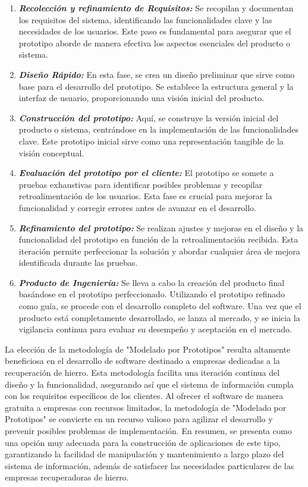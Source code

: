 \documentclass[12pt,onehalfspacing]{report}
\begin{document}
\begin{enumerate}
    \item \textbf{\textit{Recolección y refinamiento de Requisitos:}} Se recopilan y documentan los requisitos del sistema, identificando las funcionalidades clave y las necesidades de los usuarios. Este paso es fundamental para asegurar que el prototipo aborde de manera efectiva los aspectos esenciales del producto o sistema.
    \item \textbf{\textit{Diseño Rápido:}} En esta fase, se crea un diseño preliminar que sirve como base para el desarrollo del prototipo. Se establece la estructura general y la interfaz de usuario, proporcionando una visión inicial del producto.
    \item \textbf{\textit{Construcción del prototipo:}} Aquí, se construye la versión inicial del producto o sistema, centrándose en la implementación de las funcionalidades clave. Este prototipo inicial sirve como una representación tangible de la visión conceptual.
    \item \textbf{\textit{Evaluación del prototipo por el cliente:}} El prototipo se somete a pruebas exhaustivas para identificar posibles problemas y recopilar retroalimentación de los usuarios. Esta fase es crucial para mejorar la funcionalidad y corregir errores antes de avanzar en el desarrollo.
    \item \textbf{\textit{Refinamiento del prototipo:}} Se realizan ajustes y mejoras en el diseño y la funcionalidad del prototipo en función de la retroalimentación recibida. Esta iteración permite perfeccionar la solución y abordar cualquier área de mejora identificada durante las pruebas.
    \item \textbf{\textit{Producto de Ingeniería:}} Se lleva a cabo la creación del producto final basándose en el prototipo perfeccionado. Utilizando el prototipo refinado como guía, se procede con el desarrollo completo del software. Una vez que el producto está completamente desarrollado, se lanza al mercado, y se inicia la vigilancia continua para evaluar su desempeño y aceptación en el mercado.\cite{beneficios_prototipado}
\end{enumerate}
La elección de la metodología de "Modelado por Prototipos" resulta altamente beneficiosa en el desarrollo de software destinado a empresas dedicadas a la recuperación de hierro. Esta metodología facilita una iteración continua del diseño y la funcionalidad, asegurando así que el sistema de información cumpla con los requisitos específicos de los clientes. Al ofrecer el software de manera gratuita a empresas con recursos limitados, la metodología de "Modelado por Prototipos" se convierte en un recurso valioso para agilizar el desarrollo y prevenir posibles problemas de implementación. En resumen, se presenta como una opción muy adecuada para la construcción de aplicaciones de este tipo, garantizando la facilidad de manipulación y mantenimiento a largo plazo del sistema de información, además de satisfacer las necesidades particulares de las empresas recuperadoras de hierro.\\\\
\end{document}
